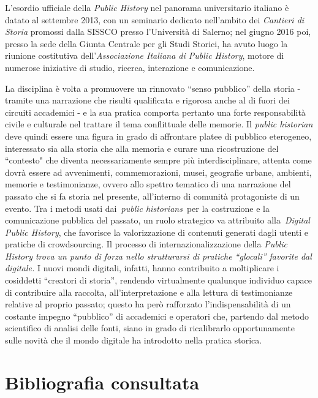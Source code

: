 \documentclass[
  b5paper,
  twoside,
  12pt,
  chapterprefix=false,
  bibliography=totocnumbered,
  parskip=false]{scrbook}
\begin{document}
L'esordio ufficiale della \emph{Public History} nel panorama universitario
italiano è datato al settembre 2013, con un seminario dedicato
nell'ambito dei \emph{Cantieri di Storia} promossi dalla SISSCO presso
l'Università di Salerno; nel giugno 2016 poi, presso la sede della
Giunta Centrale per gli Studi Storici, ha avuto luogo la riunione
costitutiva dell'\emph{Associazione Italiana di Public History}, motore di
numerose iniziative di studio, ricerca, interazione e comunicazione.

La disciplina è volta a promuovere un rinnovato \enquote{senso pubblico} della
storia - tramite una narrazione che risulti qualificata e rigorosa anche
al di fuori dei circuiti accademici - e la sua pratica comporta pertanto
una forte responsabilità civile e culturale nel trattare il tema
conflittuale delle memorie. Il \emph{public historian} deve quindi essere una
figura in grado di affrontare platee di pubblico eterogeneo, interessato
sia alla storia che alla memoria e curare una ricostruzione del
``contesto" che diventa necessariamente sempre più interdisciplinare,
attenta come dovrà essere ad avvenimenti, commemorazioni, musei,
geografie urbane, ambienti, memorie e testimonianze, ovvero allo spettro
tematico di una narrazione del passato che si fa storia nel presente,
all'interno di comunità protagoniste di un evento. Tra i metodi usati
dai~\emph{public historians}~per la costruzione e la comunicazione pubblica
del passato, un ruolo strategico va attribuito alla~\emph{Digital Public
History}, che favorisce la valorizzazione di contenuti generati dagli
utenti e pratiche di crowdsourcing. Il processo di
internazionalizzazione della \emph{Public History trova un punto di forza
nello strutturarsi di pratiche \enquote{glocali} favorite dal digitale.} I nuovi
mondi digitali, infatti, hanno contribuito a moltiplicare i cosiddetti
\enquote{creatori di storia}, rendendo virtualmente qualunque individuo capace
di contribuire alla raccolta, all'interpretazione e alla lettura di
testimonianze relative al proprio passato; questo ha però rafforzato
l'indispensabilità di un costante impegno \enquote{pubblico} di accademici e
operatori che, partendo dal metodo scientifico di analisi delle fonti,
siano in grado di ricalibrarlo opportunamente sulle novità che il mondo
digitale ha introdotto nella pratica storica.

\hypertarget{bibliografia-consultata-5}{%
\section*{Bibliografia consultata}\label{bibliografia-consultata-5}}
\end{document}
